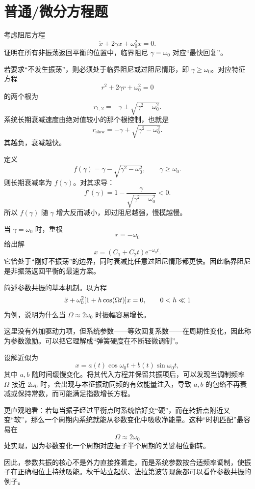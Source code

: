 \section*{普通/微分方程题}

\begin{problem}
考虑阻尼方程
\[
\ddot x+2\gamma\dot x+\omega_0^2x=0.
\]
证明在所有非振荡返回平衡的位置中，临界阻尼 $\gamma=\omega_0$ 对应“最快回复”。

\begin{solution}
若要求“不发生振荡”，则必须处于临界阻尼或过阻尼情形，即 $\gamma\ge \omega_0$。对应特征方程
\[
r^2+2\gamma r+\omega_0^2=0
\]
的两个根为
\[
r_{1,2}=-\gamma\pm\sqrt{\gamma^2-\omega_0^2}.
\]
系统长期衰减速度由绝对值较小的那个根控制，也就是
\[
r_\text{slow}=-\gamma+\sqrt{\gamma^2-\omega_0^2}.
\]
其越负，衰减越快。

定义
\[
f(\gamma)=\gamma-\sqrt{\gamma^2-\omega_0^2}, \qquad \gamma\ge \omega_0.
\]
则长期衰减率为 $f(\gamma)$。对其求导：
\[
f'(\gamma)=1-\frac{\gamma}{\sqrt{\gamma^2-\omega_0^2}}<0.
\]
所以 $f(\gamma)$ 随 $\gamma$ 增大反而减小，即过阻尼越强，慢模越慢。

当 $\gamma=\omega_0$ 时，重根
\[
r=-\omega_0
\]
给出解
\[
x=(C_1+C_2 t)\mathrm e^{-\omega_0 t}.
\]
它恰处于“刚好不振荡”的边界，同时衰减比任意过阻尼情形都更快。因此临界阻尼是非振荡返回平衡的最速方案。
\end{solution}
\end{problem}

\begin{problem}
简述参数共振的基本机制。以方程
\[
\ddot x+\omega_0^2\qty[1+h\cos(\Omega t)]x=0,
\qquad 0<h\ll 1
\]
为例，说明为什么当 $\Omega\approx 2\omega_0$ 时振幅容易增长。

\begin{solution}
这里没有外加驱动力项，但系统参数——等效回复系数——在周期性变化，因此称为参数激励。可以把它理解成“弹簧硬度在不断轻微调制”。

设解近似为
\[
x=a(t)\cos\omega_0 t+b(t)\sin\omega_0 t,
\]
其中 $a,b$ 随时间缓慢变化。将其代入方程并保留共振项后，可以发现当调制频率 $\Omega$ 接近 $2\omega_0$ 时，会出现与本征振动同频的有效能量注入，导致 $a,b$ 的包络不再衰减或保持常数，而可能满足指数增长方程。

更直观地看：若每当振子经过平衡点时系统恰好变“硬”，而在转折点附近又变“软”，那么一个周期内系统就能从参数变化中吸收净能量。这种“时机匹配”最容易在
\[
\Omega\approx 2\omega_0
\]
处实现，因为参数变化一个周期对应振子半个周期的关键相位翻转。

因此，参数共振的核心不是外力直接推着走，而是系统参数按合适频率调制，使振子在正确相位上持续吸能。秋千站立起伏、法拉第波等现象都可以看作参数共振的例子。
\end{solution}
\end{problem}
